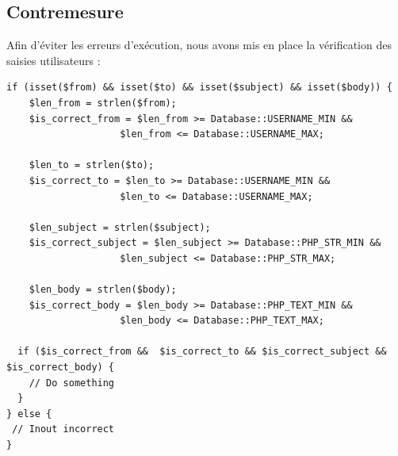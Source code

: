 \documentclass[12pt]{article}
\begin{document}
\subsection{Contremesure}\label{c7}

Afin d'éviter les erreurs d'exécution, nous avons mis en place la vérification des saisies utilisateurs :

\begin{lstlisting}[style=JAVA]
if (isset($from) && isset($to) && isset($subject) && isset($body)) {
    $len_from = strlen($from);
    $is_correct_from = $len_from >= Database::USERNAME_MIN && 
                    $len_from <= Database::USERNAME_MAX;
                            
    $len_to = strlen($to);
    $is_correct_to = $len_to >= Database::USERNAME_MIN && 
                    $len_to <= Database::USERNAME_MAX;

    $len_subject = strlen($subject);
    $is_correct_subject = $len_subject >= Database::PHP_STR_MIN && 
                    $len_subject <= Database::PHP_STR_MAX;
                            
    $len_body = strlen($body);
    $is_correct_body = $len_body >= Database::PHP_TEXT_MIN && 
                    $len_body <= Database::PHP_TEXT_MAX;

  if ($is_correct_from &&  $is_correct_to && $is_correct_subject && $is_correct_body) {
    // Do something
  }
} else {
 // Inout incorrect
}
\end{lstlisting}
\end{document}
